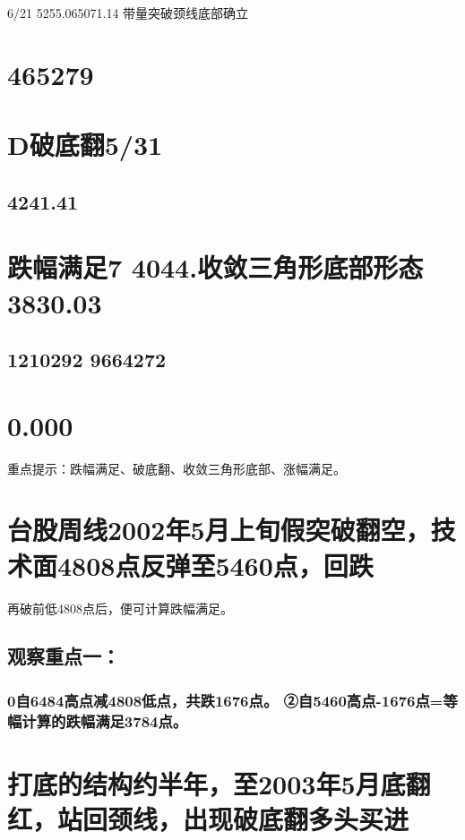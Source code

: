 \documentclass{article}
\begin{document}
6/21 5255.065071.14 带量突破颈线底部确立

\section{465279}

\section{D破底翻5/31}

\subsection{4241.41}

\section{跌幅满足7 4044.收敛三角形底部形态3830.03}

\subsection{1210292 9664272}

\section{0.000}

重点提示：跌幅满足、破底翻、收敛三角形底部、涨幅满足。

\section{台股周线2002年5月上旬假突破翻空，技术面4808点反弹至5460点，回跌}

再破前低4808点后，便可计算跌幅满足。

\subsection{观察重点一：}

\subsubsection{0自6484高点减4808低点，共跌1676点。 ②自5460高点-1676点=等幅计算的跌幅满足3784点。}

\section{打底的结构约半年，至2003年5月底翻红，站回颈线，出现破底翻多头买进}
\end{document}
